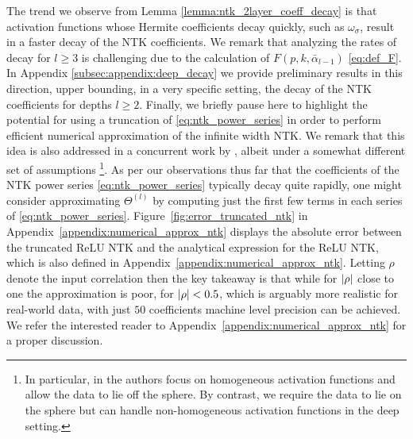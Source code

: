 The trend we observe from Lemma \ref{lemma:ntk_2layer_coeff_decay} is that activation functions whose Hermite coefficients decay quickly, such as $\omega_{\sigma}$, result in a faster decay of the NTK coefficients. We remark that analyzing the rates of decay for $l \geq 3$ is challenging due to the calculation of $F(p, k, \bar{\alpha}_{l-1})$ \eqref{eq:def_F}. In Appendix \ref{subsec:appendix:deep_decay} we provide preliminary results in this direction, upper bounding, in a very specific setting, the decay of the NTK coefficients for depths $l\geq 2$. Finally, we briefly pause here to highlight the potential for using a truncation of \eqref{eq:ntk_power_series} in order to perform efficient numerical approximation of the infinite width NTK. We remark that this idea is also addressed in a concurrent work by \cite{han2022fast}, albeit under a somewhat different set of assumptions \footnote{In particular, in \cite{han2022fast} the authors focus on homogeneous activation functions and allow the data to lie off the sphere. By contrast, we require the data to lie on the sphere but can handle non-homogeneous activation functions in the deep setting.}. As per our observations thus far that the coefficients of the NTK power series \eqref{eq:ntk_power_series} typically decay quite rapidly, one might consider approximating $\Theta^{(l)}$ by computing just the first few terms in each series of \eqref{eq:ntk_power_series}. Figure~\ref{fig:error_truncated_ntk} in Appendix~\ref{appendix:numerical_approx_ntk} displays the absolute error between the truncated ReLU NTK and the analytical expression for the ReLU NTK, which is also defined in Appendix~\ref{appendix:numerical_approx_ntk}. Letting $\rho$ denote the input correlation then the key takeaway is that while for $\left\lvert\rho\right\rvert$ close to one the approximation is poor, for $\left\lvert\rho\right\rvert<0.5$, which is arguably more realistic for real-world data, with just $50$ coefficients machine level precision can be achieved. We refer the interested reader to Appendix~\ref{appendix:numerical_approx_ntk} for a proper discussion.




